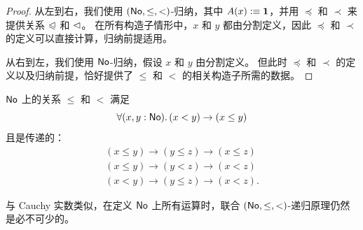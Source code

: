 \begin{proof}
  从左到右，我们使用 $(\mathsf{No},\le,<)$-归纳，其中 $A(x)\vcentcolon\equiv\mathbf{1}$，并用 $\preceq$ 和 $\prec$ 来提供关系 $\trianglelefteqslant$ 和 $\vartriangleleft$。
  在所有构造子情形中，$x$ 和 $y$ 都由分割定义，因此 $\preceq$ 和 $\prec$ 的定义可以直接计算，归纳前提适用。

  从右到左，我们使用 $\mathsf{No}$-归纳，假设 $x$ 和 $y$ 由分割定义。
  但此时 $\preceq$ 和 $\prec$ 的定义以及归纳前提，恰好提供了 $\le$ 和 $<$ 的相关构造子所需的数据。
\end{proof}

\begin{cor}\label{thm:NO-unstrict-transitive}
  $\mathsf{No}$ 上的关系 $\le$ 和 $<$ 满足
  \[ \fall{x,y:\NO} (x<y) \to (x\le y) \]
  且是传递的：
  \begin{gather*}
    (x\le y) \to (y\le z) \to (x\le z)\\
    (x\le y) \to (y< z) \to (x< z)\\
    (x< y) \to (y\le z) \to (x< z).
  \end{gather*}
\end{cor}

与 Cauchy 实数类似，在定义 $\mathsf{No}$ 上所有运算时，联合 $(\mathsf{No},\le,<)$-递归原理仍然是必不可少的。

